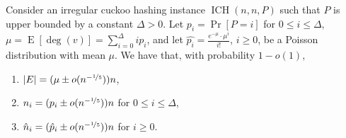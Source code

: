 \documentclass[11pt]{article}
\DeclareMathOperator*{\E}{E}
\DeclareMathOperator*{\irregularcuckoohashing}{ICH}
\begin{document}
\begin{observationrep}\label{obs:graph-concentrated}
Consider an irregular cuckoo hashing instance $\irregularcuckoohashing(n,n,P)$ such that $P$ is upper bounded by a constant $\Delta>0$. Let $p_i=\Pr[P=i]$ for $0\leq i\leq \Delta$, $\mu = \E[\deg(v)] = \sum_{i=0}^\Delta i p_i$, and let $\hat{p_i}=\frac{e^{-\mu} \cdot \mu^i}{i!}$, $i\geq 0$, be a Poisson distribution with mean $\mu$. We have that, with probability $1-o(1)$, 
\begin{enumerate}
    \item $|E|=(\mu \pm o(n^{-\nicefrac15})) n$,
    \item $n_i=(p_i \pm o(n^{-\nicefrac15}))n$ for $0 \leq i \leq \Delta$,
    \item $\hat{n}_i = (\hat{p}_i \pm o(n^{-\nicefrac15}))n$ for $i\geq 0$.
\end{enumerate}
\end{observationrep}
\end{document}
